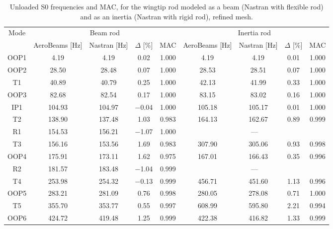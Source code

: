 \documentclass[journal]{new-aiaa}
\begin{document}
\begin{table}[ht!]
    \centering
    \caption{Unloaded S0 frequencies and MAC, for the wingtip rod modeled as a beam (Nastran with flexible rod) and as an inertia (Nastran with rigid rod), refined mesh.}
    \label{tab:S0_modal_rigidtipvsflextip_comparison}
    \begin{tabular}{c cccc cccc}
        \toprule
        \multirow{2}{*}{Mode} & \multicolumn{4}{c}{Beam rod} & \multicolumn{4}{c}{Inertia rod} \\
        \cmidrule(lr){2-5} \cmidrule(lr){6-9}
        & AeroBeams [Hz] & Nastran [Hz] & $\Delta$ [\%] & MAC & AeroBeams [Hz] & Nastran [Hz] & $\Delta$ [\%] & MAC \\
        \midrule
        OOP1 & 4.19 & 4.19 & 0.02 & 1.000 & 4.19 & 4.19 & 0.01 & 1.000 \\
        OOP2 & 28.50 & 28.48 & 0.07 & 1.000 & 28.53 & 28.51 & 0.07 & 1.000 \\
        T1 & 40.89 & 40.79 & 0.25 & 1.000 & 42.13 & 41.99 & 0.33 & 1.000 \\
        OOP3 & 82.68 & 82.54 & 0.17 & 1.000 & 83.15 & 83.02 & 0.16 & 1.000 \\
        IP1 & 104.93 & 104.97 & $-$0.04 & 1.000 & 105.18 & 105.17 & 0.01 & 1.000 \\
        T2 & 138.90 & 137.48 & 1.03 & 0.983 & 164.13 & 162.67 & 0.89 & 0.999 \\
        R1 & 154.53 & 156.21 & $-$1.07 & 1.000 & \multicolumn{4}{c}{---} \\
        T3 & 156.16 & 153.56 & 1.69 & 0.983 & 307.90 & 305.06 & 0.93 & 0.998 \\
        OOP4 & 175.91 & 173.11 & 1.62 & 0.975 & 167.01 & 166.43 & 0.35 & 0.996 \\
        R2 & 181.57 & 183.48 & $-$1.04 & 0.999 & \multicolumn{4}{c}{---} \\
        T4 & 253.98 & 254.32 & $-$0.13 & 0.999 & 456.71 & 451.60 & 1.13 & 0.996 \\
        OOP5 & 283.21 & 281.09 & 0.76 & 0.998 & 280.05 & 278.08 & 0.71 & 1.000 \\
        T5 & 355.70 & 353.77 & 0.55 & 0.997 & 608.99 & 595.80 & 2.21 & 0.994 \\
        OOP6 & 424.72 & 419.48 & 1.25 & 0.999 & 422.38 & 416.82 & 1.33 & 0.999 \\
        \bottomrule
    \end{tabular}
\end{table}
\end{document}
